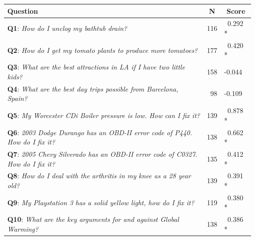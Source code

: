 \begin{table}
  \centering
  \footnotesize
  \begin{tabular}{l r l}

	Question &
	\multicolumn{1}{c}{N} &
    \multicolumn{1}{c}{Score} \\
    \hline
	\multicolumn{1}{p{0.75\columnwidth}}{\textbf{Q1}: \textit{How do I unclog my bathtub drain?}}
	& 116 & ~0.292 * \\

	\multicolumn{1}{p{0.75\columnwidth}}{\textbf{Q2}: \textit{How do I get my tomato plants to produce more tomatoes?}}
	& 177 & ~0.420 * \\

	\multicolumn{1}{p{0.75\columnwidth}}{\textbf{Q3}: \textit{What are the best attractions in LA if I have two little kids?}}
	& 158 & -0.044 \\

	\multicolumn{1}{p{0.75\columnwidth}}{\textbf{Q4}: \textit{What are the best day trips possible from Barcelona, Spain?}}
	& 98 & -0.109 \\

	\multicolumn{1}{p{0.75\columnwidth}}{\textbf{Q5}: \textit{My Worcester CDi Boiler pressure is low. How can I fix it?}}
	& 139 & ~0.878 * \\

	\multicolumn{1}{p{0.75\columnwidth}}{\textbf{Q6}: \textit{2003 Dodge Durango has an OBD-II error code of P440. How do I fix it?}}
	& 138 & ~0.662 * \\

	\multicolumn{1}{p{0.75\columnwidth}}{\textbf{Q7}: \textit{2005 Chevy Silverado has an OBD-II error code of C0327. How do I fix it?}}
	& 135 & ~0.412 * \\

	\multicolumn{1}{p{0.75\columnwidth}}{\textbf{Q8}: \textit{How do I deal with the arthritis in my knee as a 28 year old?}}
	& 139 & ~0.391 * \\

	\multicolumn{1}{p{0.75\columnwidth}}{\textbf{Q9}: \textit{My Playstation 3 has a solid yellow light, how do I fix it?}}
	& 119 & ~0.380 * \\

	\multicolumn{1}{p{0.75\columnwidth}}{\textbf{Q10}: \textit{What are the key arguments for and against Global Warming?}}
	& 138 & ~0.386 * \\


\end{tabular}
\end{table}
